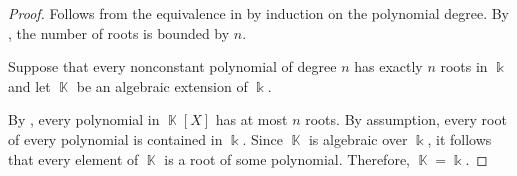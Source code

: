 \begin{proof}
   Follows from the equivalence in  by induction on the polynomial degree. By , the number of roots is bounded by \( n \).

   Suppose that every nonconstant polynomial of degree \( n \) has exactly \( n \) roots in \( \Bbbk \) and let \( \BbbK \) be an algebraic extension of \( \Bbbk \).

  By , every polynomial in \( \BbbK[X] \) has at most \( n \) roots. By assumption, every root of every polynomial is contained in \( \Bbbk \). Since \( \BbbK \) is algebraic over \( \Bbbk \), it follows that every element of \( \BbbK \) is a root of some polynomial. Therefore, \( \BbbK = \Bbbk \).
\end{proof}

